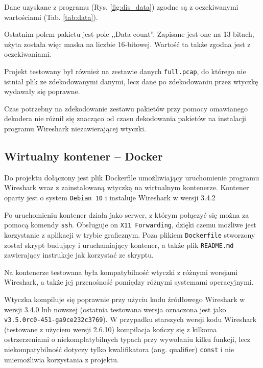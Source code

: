\documentclass[a4paper, 11pt, twoside, openright]{article}
\begin{document}
	Dane uzyskane z programu (Rys. \ref{fig:dis_data}) zgodne są z oczekiwanymi wartościami (Tab. \ref{tab:data}).

	Ostatnim polem pakietu jest pole ,,Data count''. Zapisane jest one na 13 bitach, użyta została więc maska na liczbie 16-bitowej.
	Wartość ta także zgodna jest z oczekiwaniami.

	Projekt testowany był również na zestawie danych \texttt{full.pcap}, do którego nie istniał plik ze zdekodowanymi danymi,
	lecz dane po zdekodowaniu przez wtyczkę wydawały się poprawne.

	Czas potrzebny na zdekodowanie zestawu pakietów przy pomocy omawianego dekodera nie różnił się znacząco od czasu dekodowania pakietów
	na instalacji programu Wireshark niezawierającej wtyczki.

	\subsection{Wirtualny kontener -- Docker}

	\indent\par
	Do projektu dołączony jest plik Dockerfile umożliwiający uruchomienie programu Wireshark wraz z zainstalowaną wtyczką
	na wirtualnym kontenerze. Kontener oparty jest o system \texttt{Debian 10} i instaluje Wireshark w wersji 3.4.2

	Po uruchomieniu kontener działa jako serwer, z którym połączyć się można za pomocą komendy \texttt{ssh}.
	Obsługuje on \texttt{X11 Forwarding}, dzięki czemu możliwe jest korzystanie z aplikacji w trybie graficznym.
	Poza plikiem \texttt{Dockerfile} stworzony został skrypt budujący i uruchamiający kontener, a także plik
	\texttt{README.md} zawierający instrukcje jak korzystać ze skryptu.

	Na kontenerze testowana była kompatybilność wtyczki z różnymi wersjami Wireshark, a także jej przenośność pomiędzy
	różnymi systemami operacyjnymi.

	Wtyczka kompiluje się poprawnie przy użyciu kodu źródłowego Wireshark w wersji 3.4.0 lub nowszej (ostatnia testowana
	wersja oznaczona jest jako \\ \texttt{v3.5.0rc0-451-ga9ce232c3769}). W przypadku starszych wersji kodu Wireshark
	(testowane z użyciem wersji 2.6.10) kompilacja kończy się z kilkoma ostrzerzeniami o niekomplatybilnych typach przy
	wywołaniu kilku funkcji, lecz niekompatybilność dotyczy tylko kwalifikatora (ang. qualifier) \texttt{const}
	i nie uniemożliwia korzystania z projektu.
\end{document}
